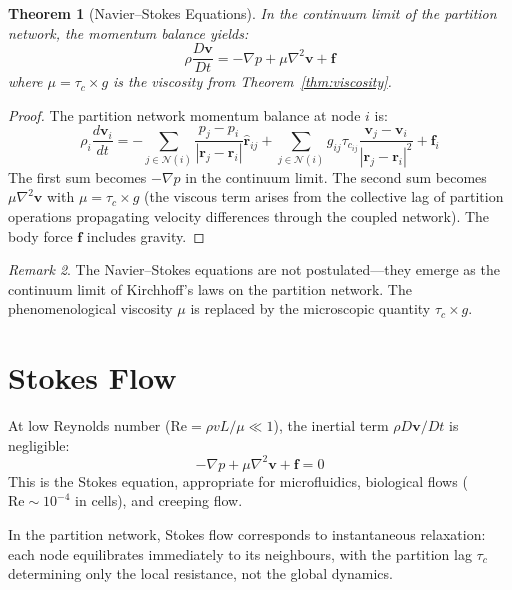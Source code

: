 \documentclass[twocolumn,10pt,a4paper]{article}
\theoremstyle{plain}
\newtheorem{theorem}{Theorem}[section]
\theoremstyle{definition}
\theoremstyle{remark}
\newtheorem{remark}[theorem]{Remark}
\newcommand{\tauc}{\tau_c}
\begin{document}
\begin{theorem}[Navier--Stokes Equations]
\label{thm:ns}
In the continuum limit of the partition network, the momentum balance yields:
\begin{equation}
\boxed{\rho \frac{D\mathbf{v}}{Dt} = -\nabla p + \mu \nabla^2 \mathbf{v} + \mathbf{f}}
\end{equation}
where $\mu = \tauc \times g$ is the viscosity from Theorem~\ref{thm:viscosity}.
\end{theorem}

\begin{proof}
The partition network momentum balance at node $i$ is:
\begin{equation}
    \rho_i \frac{d\mathbf{v}_i}{dt} = -\sum_{j \in \mathcal{N}(i)} \frac{p_j - p_i}{|\mathbf{r}_j - \mathbf{r}_i|}\hat{\mathbf{r}}_{ij} + \sum_{j \in \mathcal{N}(i)} g_{ij} \tauc_{ij} \frac{\mathbf{v}_j - \mathbf{v}_i}{|\mathbf{r}_j - \mathbf{r}_i|^2} + \mathbf{f}_i
\end{equation}
The first sum becomes $-\nabla p$ in the continuum limit. The second sum becomes $\mu \nabla^2 \mathbf{v}$ with $\mu = \tauc \times g$ (the viscous term arises from the collective lag of partition operations propagating velocity differences through the coupled network). The body force $\mathbf{f}$ includes gravity.
\end{proof}

\begin{remark}
The Navier--Stokes equations are not postulated---they emerge as the continuum limit of Kirchhoff's laws on the partition network. The phenomenological viscosity $\mu$ is replaced by the microscopic quantity $\tauc \times g$.
\end{remark}

\section{Stokes Flow}
\label{sec:stokes}

At low Reynolds number ($\mathrm{Re} = \rho v L/\mu \ll 1$), the inertial term $\rho D\mathbf{v}/Dt$ is negligible:
\begin{equation}
    -\nabla p + \mu \nabla^2 \mathbf{v} + \mathbf{f} = 0
\end{equation}
This is the Stokes equation, appropriate for microfluidics, biological flows ($\mathrm{Re} \sim 10^{-4}$ in cells), and creeping flow.

In the partition network, Stokes flow corresponds to instantaneous relaxation: each node equilibrates immediately to its neighbours, with the partition lag $\tauc$ determining only the local resistance, not the global dynamics.
\end{document}
